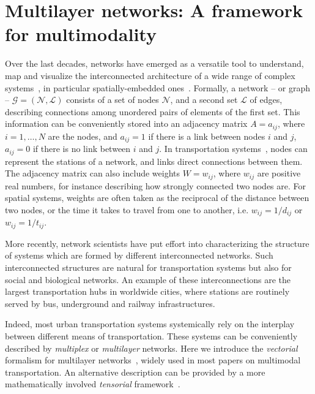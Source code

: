 \section{Multilayer networks: A framework for multimodality}\label{sec:multilayernetworks}

Over the last decades, networks have emerged as a versatile tool to understand, map and visualize the interconnected architecture of a wide range of complex systems~\cite{albert2002statistical,dorogovtsev2002evolution, newman2003structure, boccaletti2006complex}, in particular spatially-embedded ones~\cite{barthelemy2011spatial, barthelemy2018morphogenesis}. Formally, a network -- or graph -- $\mathcal G = (\mathcal N, \mathcal L)$ consists of a set of nodes $\mathcal N$, and a second set $\mathcal L$ of edges, describing connections among unordered pairs of elements of the first set. This information can be conveniently stored into an adjacency matrix ${A=a_{ij}}$, where $i=1, \dots, N$ are the nodes, and $a_{ij}=1$ if there is a link between nodes $i$ and $j$, $a_{ij}=0$ if there is no link between $i$ and $j$. In transportation systems~\cite{lin2013complex}, nodes can represent the stations of a network, and links direct connections between them. The adjacency matrix can also include weights $W=w_{ij}$, where $w_{ij}$ are positive real numbers, for instance describing how strongly connected two nodes are. For spatial systems, weights are often taken as the reciprocal of the distance between two nodes, or the time it takes to travel from one to another, i.e. $w_{ij}=1/d_{ij}$ or $w_{ij}=1/t_{ij}$.

More recently, network scientists have put effort into characterizing the structure of systems which are formed by different interconnected networks. Such interconnected structures are natural for transportation systems but also for social and biological networks. An example of these interconnections are the largest transportation hubs in worldwide cities, where stations are routinely served by bus, underground and railway infrastructures.

Indeed, most urban transportation systems systemically rely on the interplay between different means of transportation. These systems can be conveniently described by \textit{multiplex} or \textit{multilayer} networks. Here we introduce the \textit{vectorial} formalism for multilayer networks~\cite{boccaletti2014structure, battiston2014structural}, widely used in most papers on multimodal transportation. An alternative description can be provided by a more mathematically involved \textit{tensorial} framework~\cite{dedomenico2013mathematical, kivela2014multilayer}.  

